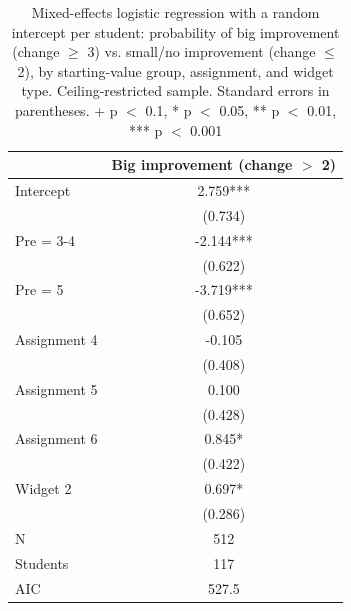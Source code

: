 \begin{table}
\centering
\begin{tabular}{lc}
\toprule
 & Big improvement (change $>$ 2) \\
\midrule
Intercept & 2.759*** \\
 & (0.734) \\
Pre = 3-4 & -2.144*** \\
 & (0.622) \\
Pre = 5 & -3.719*** \\
 & (0.652) \\
Assignment 4 & -0.105 \\
 & (0.408) \\
Assignment 5 & 0.100 \\
 & (0.428) \\
Assignment 6 & 0.845* \\
 & (0.422) \\
Widget 2 & 0.697* \\
 & (0.286) \\
\midrule
N & 512 \\
Students & 117 \\
AIC & 527.5 \\
\bottomrule
\end{tabular}
\caption{Mixed-effects logistic regression with a random intercept per student: probability of big improvement (change $\geq$ 3) vs. small/no improvement (change $\leq$ 2), by starting-value group, assignment, and widget type. Ceiling-restricted sample. Standard errors in parentheses. + p $<$ 0.1, * p $<$ 0.05, ** p $<$ 0.01, *** p $<$ 0.001}
\label{tab:improvement_logistic}
\end{table}
